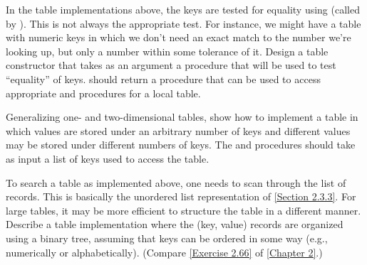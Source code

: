 \begin{exercise}
	\label{Exercise 3.24}
	In the table implementations above, the keys are tested for equality using  (called by ).
	This is not always the appropriate test.
	For instance, we might have a table with numeric keys in which we don’t need an exact match to the number we’re looking up, but only a number within some tolerance of it.
	Design a table constructor  that takes as an argument a  procedure that will be used to test “equality” of keys.
	 should return a  procedure that can be used to access appropriate  and  procedures for a local table.
\end{exercise}



\begin{exercise}
	\label{Exercise 3.25}
	Generalizing one- and two-dimensional tables, show how to implement a table in which values are stored under an arbitrary number of keys and different values may be stored under different numbers of keys.
	The  and  procedures should take as input a list of keys used to access the table.
\end{exercise}



\begin{exercise}
	\label{Exercise 3.26}
	To search a table as implemented above, one needs to scan through the list of records.
	This is basically the unordered list representation of \cref{Section 2.3.3}.
	For large tables, it may be more efficient to structure the table in a different manner.
	Describe a table implementation where the (key, value) records are organized using a binary tree, assuming that keys can be ordered in some way (e.g., numerically or alphabetically).
	(Compare \cref{Exercise 2.66} of \cref{Chapter 2}.)
\end{exercise}



